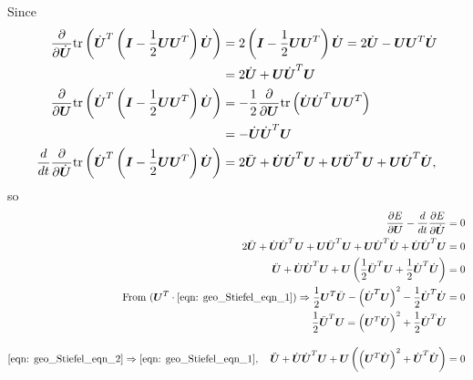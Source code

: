 \documentclass[11pt]{article}
\begin{document}
\begin{enumerate}
Since 
\begin{align*}
\frac{\partial }{ \partial \dot{\boldsymbol{U}}} \mathrm{tr}\left( \dot{\boldsymbol{U}}^{T} \left( \boldsymbol{I} - \frac{1}{2}\boldsymbol{U}\boldsymbol{U}^{T} \right) \dot{\boldsymbol{U}}  \right) 
&=2\left( \boldsymbol{I} - \frac{1}{2}\boldsymbol{U}\boldsymbol{U}^{T}\right) \dot{\boldsymbol{U}} = 2\dot{\boldsymbol{U}} - \boldsymbol{U}\boldsymbol{U}^{T}\dot{\boldsymbol{U}} \\
&= 2\dot{\boldsymbol{U}} + \boldsymbol{U}\dot{\boldsymbol{U}}^{T}\boldsymbol{U} \\
\frac{\partial }{ \partial \boldsymbol{U}} \mathrm{tr}\left( \dot{\boldsymbol{U}}^{T} \left( \boldsymbol{I} - \frac{1}{2}\boldsymbol{U}\boldsymbol{U}^{T} \right) \dot{\boldsymbol{U}}  \right) 
&= -\frac{1}{2}\frac{\partial }{ \partial \boldsymbol{U}} \mathrm{tr}\left(  \dot{\boldsymbol{U}}\dot{\boldsymbol{U}}^{T} \boldsymbol{U}\boldsymbol{U}^{T}    \right)\\
&= -\dot{\boldsymbol{U}}\dot{\boldsymbol{U}}^{T}\boldsymbol{U}\\
\frac{d}{dt}\frac{\partial }{ \partial \dot{\boldsymbol{U}}} \mathrm{tr}\left( \dot{\boldsymbol{U}}^{T} \left( \boldsymbol{I} - \frac{1}{2}\boldsymbol{U}\boldsymbol{U}^{T} \right) \dot{\boldsymbol{U}}  \right) &= 
2\ddot{\boldsymbol{U}} + \dot{\boldsymbol{U}}\dot{\boldsymbol{U}}^{T}\boldsymbol{U} + \boldsymbol{U}\ddot{\boldsymbol{U}}^{T}\boldsymbol{U}+ \boldsymbol{U}\dot{\boldsymbol{U}}^{T}\dot{\boldsymbol{U}}  ,
\end{align*}
so 
\begin{align}
\frac{\partial E}{ \partial \boldsymbol{U}} - \frac{d}{dt}\frac{\partial E}{ \partial \dot{\boldsymbol{U}}} &= 0 \nonumber\\
2\ddot{\boldsymbol{U}} + \dot{\boldsymbol{U}}\dot{\boldsymbol{U}}^{T}\boldsymbol{U} + \boldsymbol{U}\ddot{\boldsymbol{U}}^{T}\boldsymbol{U}+ \boldsymbol{U}\dot{\boldsymbol{U}}^{T}\dot{\boldsymbol{U}} + \dot{\boldsymbol{U}}\dot{\boldsymbol{U}}^{T}\boldsymbol{U}&= 0\nonumber\\
\ddot{\boldsymbol{U}} +\dot{\boldsymbol{U}}\dot{\boldsymbol{U}}^{T}\boldsymbol{U} +\boldsymbol{U}\left( \frac{1}{2}\ddot{\boldsymbol{U}}^{T}\boldsymbol{U}+\frac{1}{2}\dot{\boldsymbol{U}}^{T}\dot{\boldsymbol{U}} \right) &= 0 \label{eqn: geo_Stiefel_eqn_1}\\
\text{From } (\boldsymbol{U}^{T}\cdot\eqref{eqn: geo_Stiefel_eqn_1}) \Rightarrow \frac{1}{2}\boldsymbol{U}^{T}\ddot{\boldsymbol{U}}- \left(\dot{\boldsymbol{U}}^{T}\boldsymbol{U}\right)^{2}  - \frac{1}{2}\dot{\boldsymbol{U}}^{T}\dot{\boldsymbol{U}}  &= 0 \nonumber\\
\frac{1}{2}\ddot{\boldsymbol{U}}^{T}\boldsymbol{U} = \left(\boldsymbol{U}^{T}\dot{\boldsymbol{U}}\right)^{2}  + \frac{1}{2}\dot{\boldsymbol{U}}^{T}\dot{\boldsymbol{U}} &\label{eqn: geo_Stiefel_eqn_2}\\[10pt]
\eqref{eqn: geo_Stiefel_eqn_2}\Rightarrow \eqref{eqn: geo_Stiefel_eqn_1}, \quad \ddot{\boldsymbol{U}} +\dot{\boldsymbol{U}}\dot{\boldsymbol{U}}^{T}\boldsymbol{U} +\boldsymbol{U}\left(  \left(\boldsymbol{U}^{T}\dot{\boldsymbol{U}}\right)^{2}   + \dot{\boldsymbol{U}}^{T}\dot{\boldsymbol{U}} \right) &=0
\label{eqn: geo_Stiefel_eqn_final}
\end{align}


\end{enumerate}
\end{document}
